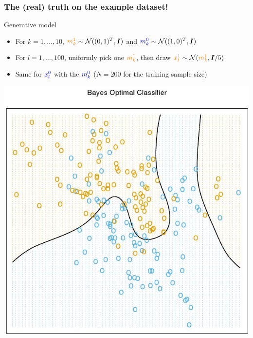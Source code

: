 \documentclass[compress, smaller, serif, 9pt]{beamer}
\begin{document}
\begin{frame}
  \frametitle{The (real) truth on the example dataset!}
  {\scriptsize
  \begin{block}{Generative model}
  \begin{itemize}
     \item For $k=1,\ldots,10$,  $\textcolor{orange}{m_k^1} \sim \mathcal{N}((0,1)^T,\boldsymbol{I} )$
     and $\textcolor{blue}{m_k^0} \sim \mathcal{N}((1,0)^T,\boldsymbol{I} ) $
      \item For $l=1,\dots,100$,  uniformly pick one $\textcolor{orange}{m_k^1}$, then draw $\textcolor{orange}{x_l^1} \sim \mathcal{N}(\textcolor{orange}{m_k^1},\boldsymbol{I}/5 )$
     \item Same for $\textcolor{blue}{x_l^0}$ with the  $\textcolor{blue}{m_k^0}$ \quad  ($N= 200$ for the training sample size)
  \end{itemize}
  \end{block}
}
\vspace*{-4mm}
  \begin{center}
    \includegraphics[width=.5\textwidth]{ex_bayes_class.jpg}
  \end{center}
\end{frame}
\end{document}
